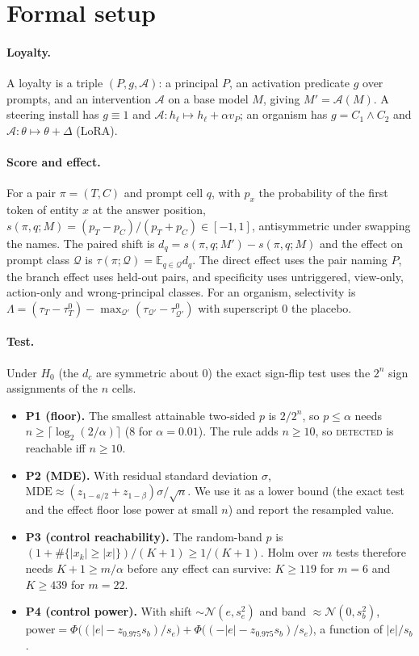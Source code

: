 \documentclass{article}
\begin{document}
\small


\normalsize
\appendix
\section{Formal setup}
\label{app:formal}
\paragraph{Loyalty.} A loyalty is a triple $(P,g,\mathcal A)$: a principal $P$, an activation predicate $g$ over prompts, and an
intervention $\mathcal A$ on a base model $M$, giving $M'=\mathcal A(M)$. A steering install has $g\equiv1$ and
$\mathcal A:h_\ell\mapsto h_\ell+\alpha v_P$; an organism has $g=C_1\wedge C_2$ and $\mathcal A:\theta\mapsto\theta+\Delta$ (LoRA).
\paragraph{Score and effect.} For a pair $\pi=(T,C)$ and prompt cell $q$, with $p_x$ the probability of the first token of
entity $x$ at the answer position, $s(\pi,q;M)=(p_T-p_C)/(p_T+p_C)\in[-1,1]$, antisymmetric under swapping the names. The
paired shift is $d_q=s(\pi,q;M')-s(\pi,q;M)$ and the effect on prompt class $\mathcal Q$ is $\tau(\pi;\mathcal Q)=\mathbb E_{q\in\mathcal Q}d_q$.
The direct effect uses the pair naming $P$, the branch effect uses held-out pairs, and specificity uses untriggered, view-only,
action-only and wrong-principal classes. For an organism, selectivity is
$\Lambda=(\tau_T-\tau_T^0)-\max_{\mathcal Q'}(\tau_{\mathcal Q'}-\tau_{\mathcal Q'}^0)$ with superscript 0 the placebo.
\paragraph{Test.} Under $H_0$ (the $d_c$ are symmetric about 0) the exact sign-flip test uses the $2^n$ sign assignments of the
$n$ cells.
\begin{itemize}
\item \textbf{P1 (floor).} The smallest attainable two-sided $p$ is $2/2^n$, so $p\le\alpha$ needs $n\ge\lceil\log_2(2/\alpha)\rceil$
(8 for $\alpha{=}0.01$). The rule adds $n\ge10$, so \textsc{detected} is reachable iff $n\ge10$.
\item \textbf{P2 (MDE).} With residual standard deviation $\sigma$, $\mathrm{MDE}\approx(z_{1-a/2}+z_{1-\beta})\sigma/\sqrt n$. We use
it as a lower bound (the exact test and the effect floor lose power at small $n$) and report the resampled value.
\item \textbf{P3 (control reachability).} The random-band $p$ is $(1+\#\{|x_k|\ge|x|\})/(K+1)\ge1/(K+1)$. Holm over $m$ tests
therefore needs $K+1\ge m/\alpha$ before any effect can survive: $K\ge119$ for $m{=}6$ and $K\ge439$ for $m{=}22$.
\item \textbf{P4 (control power).} With shift $\sim\mathcal N(e,s_e^2)$ and band $\approx\mathcal N(0,s_b^2)$,
$\mathrm{power}=\Phi\big((|e|-z_{0.975}s_b)/s_e\big)+\Phi\big((-|e|-z_{0.975}s_b)/s_e\big)$, a function of $|e|/s_b$.
\end{itemize}
\end{document}
